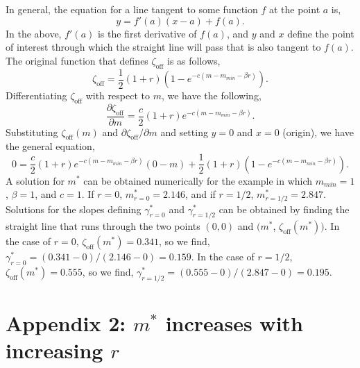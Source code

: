 \documentclass[12pt]{article}
\begin{document}
In general, the equation for a line tangent to some function $f$ at the point $a$ is,
\begin{equation}
y = f'\left(a\right)\left(x-a\right) + f\left(a\right).
\end{equation}
In the above, $f'(a)$ is the first derivative of $f(a)$, and $y$ and $x$ define the point of interest through which the straight line will pass that is also tangent to $f(a)$. The original function that defines $\zeta_{\textrm{off}}$ is as follows,
\begin{equation}
\zeta_{\textrm{off}} = \frac{1}{2}\left(1+r\right)\left(1-e^{-c\left(m-m_{min}-\beta r\right)}\right).
\end{equation}
Differentiating $\zeta_{\textrm{off}}$ with respect to $m$, we have the following,
\begin{equation}
\frac{\partial \zeta_{\textrm{off}}}{\partial m} = \frac{c}{2} \left(1+r\right)e^{-c\left(m-m_{min}-\beta r\right)}.
\end{equation}
Substituting $\zeta_{\textrm{off}}(m)$ and $\partial \zeta_{\textrm{off}} / \partial m$ and setting $y=0$ and $x=0$ (origin), we have the general equation, 
\begin{equation}
0 = \frac{c}{2} \left(1+r\right)e^{-c\left(m-m_{min}-\beta r\right)}\left(0-m\right) + \frac{1}{2}\left(1+r\right)\left(1-e^{-c\left(m-m_{min}-\beta r\right)}\right).
\end{equation}
A solution for $m^{*}$ can be obtained numerically for the example in which $m_{min}=1$, $\beta=1$, and $c=1$. If $r=0$, $m^{*}_{r=0}=2.146$, and if $r=1/2$, $m^{*}_{r=1/2}=2.847$. Solutions for the slopes defining $\gamma^{*}_{r=0}$ and $\gamma^{*}_{r=1/2}$ can be obtained by finding the straight line that runs through the two points $(0,0)$ and $(m^{*}$, $\zeta_{\textrm{off}}(m^{*}))$. In the case of $r=0$, $\zeta_{\textrm{off}}(m^{*})=0.341$, so we find, $\gamma^{*}_{r=0}=(0.341 - 0)/(2.146 - 0)=0.159$. In the case of $r=1/2$, $\zeta_{\textrm{off}}(m^{*})=0.555$, so we find, $\gamma^{*}_{r=1/2}=(0.555-0)/(2.847-0)=0.195$. 

\section*{Appendix 2: $m^{*}$ increases with increasing $r$}
\end{document}
